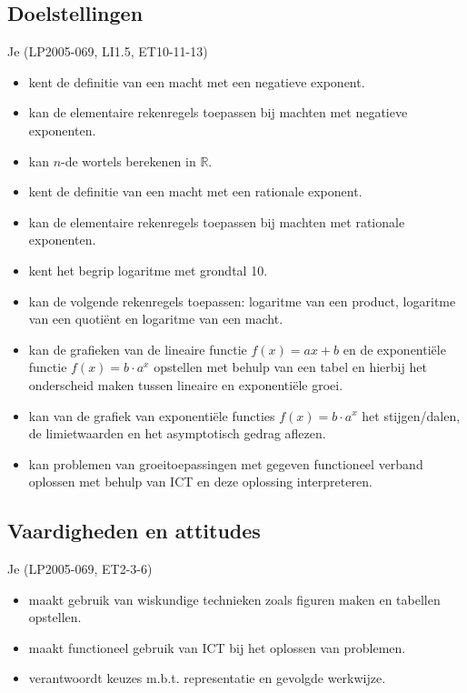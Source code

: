 \documentclass[12pt,twoside,a4paper]{article}
\begin{document}
\subsection*{Doelstellingen}
\begin{singlespacing}
Je \hfill  {\scriptsize(LP2005-069, LI1.5, ET10-11-13)}
\begin{itemize}
  \itemsep-0.2em
  \item kent de definitie van een macht met een negatieve exponent.
  \item kan de elementaire rekenregels toepassen bij machten met negatieve exponenten.
  \item kan $n$-de wortels berekenen in $\mathbb{R}$.
  \item kent de definitie van een macht met een rationale exponent.
  \item kan de elementaire rekenregels toepassen bij machten met rationale exponenten.
  \item kent het begrip logaritme met grondtal 10.
  \item kan de volgende rekenregels toepassen: logaritme van een product, logaritme van een quotiënt en logaritme van een macht.
  \item kan de grafieken van de lineaire functie $f(x) = ax + b$ en de exponentiële functie $f(x) = b\cdot a^x$ opstellen met behulp van een tabel en hierbij het onderscheid maken tussen lineaire en exponentiële groei.
  \item kan van de grafiek van exponentiële functies $f(x)=b\cdot a^x$ het stijgen/dalen, de limietwaarden en
het asymptotisch gedrag aflezen.
  \item kan problemen van groeitoepassingen met gegeven functioneel verband oplossen met behulp van ICT en deze oplossing interpreteren.
\end{itemize}
\subsection*{Vaardigheden en attitudes}
Je \hfill {\scriptsize(LP2005-069, ET2-3-6)}
\begin{itemize}
  \itemsep-0.2em
  \item maakt gebruik van wiskundige technieken zoals figuren maken en tabellen opstellen.
  \item maakt functioneel gebruik van ICT bij het oplossen van problemen.
  \item verantwoordt keuzes m.b.t. representatie en gevolgde werkwijze.
\end{itemize}
\end{singlespacing}
\vspace*{-1cm}
\end{document}
